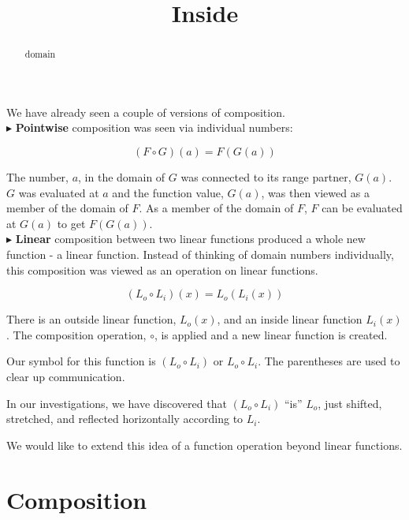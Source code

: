 \documentclass{ximera}
\title{Inside}
\begin{document}
\begin{abstract}
domain
\end{abstract}
\maketitle



We have already seen a couple of versions of composition. \\

$\blacktriangleright$ \textbf{\textcolor{purple!85!blue}{Pointwise}} composition was seen via individual numbers: 

\[ (F \circ G)(a) = F(G(a)) \]

The number, $a$, in the domain of $G$ was connected to its range partner, $G(a)$.  $G$ was evaluated at $a$ and the function value, $G(a)$, was then viewed as a member of the domain of $F$.  As a member of the domain of $F$, $F$ can be evaluated at $G(a)$ to get $F(G(a))$. \\




$\blacktriangleright$ \textbf{\textcolor{purple!85!blue}{Linear}} composition between two linear functions produced a whole new function - a linear function.  Instead of thinking of domain numbers individually, this composition was viewed as an operation on linear functions.

\[    (L_o \circ L_i)(x) = L_o(L_i(x))  \]

There is an outside linear function, $L_o(x)$, and an inside linear function $L_i(x)$.  The composition operation, $\circ$, is applied and a new linear function is created.  



Our symbol for this function is $(L_o \circ L_i)$ or $L_o \circ L_i$.  The parentheses are used to clear up communication.

In our investigations, we have discovered that $(L_o \circ L_i)$ ``is'' $L_o$, just shifted, stretched, and reflected horizontally according to $L_i$.


We would like to extend this idea of a function operation beyond linear functions.





\section*{Composition}
\end{document}
